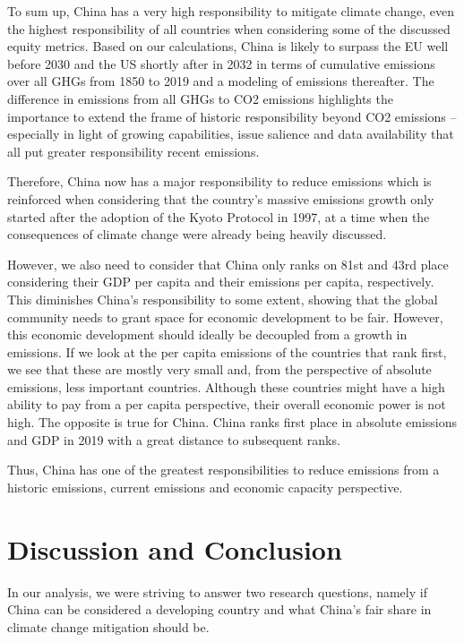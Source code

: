\documentclass[
  12pt,
]{article}
\numberwithin{equation}{section}
\numberwithin{table}{section}
\numberwithin{figure}{section}
\begin{document}
To sum up, China has a very high responsibility to mitigate climate
change, even the highest responsibility of all countries when
considering some of the discussed equity metrics. Based on our
calculations, China is likely to surpass the EU well before 2030 and the
US shortly after in 2032 in terms of cumulative emissions over all GHGs
from 1850 to 2019 and a modeling of emissions thereafter. The difference
in emissions from all GHGs to CO2 emissions highlights the importance to
extend the frame of historic responsibility beyond CO2 emissions --
especially in light of growing capabilities, issue salience and data
availability that all put greater responsibility recent emissions.

Therefore, China now has a major responsibility to reduce emissions
which is reinforced when considering that the country's massive
emissions growth only started after the adoption of the Kyoto Protocol
in 1997, at a time when the consequences of climate change were already
being heavily discussed.

However, we also need to consider that China only ranks on 81st and 43rd
place considering their GDP per capita and their emissions per capita,
respectively. This diminishes China's responsibility to some extent,
showing that the global community needs to grant space for economic
development to be fair. However, this economic development should
ideally be decoupled from a growth in emissions. If we look at the per
capita emissions of the countries that rank first, we see that these are
mostly very small and, from the perspective of absolute emissions, less
important countries. Although these countries might have a high ability
to pay from a per capita perspective, their overall economic power is
not high. The opposite is true for China. China ranks first place in
absolute emissions and GDP in 2019 with a great distance to subsequent
ranks.

Thus, China has one of the greatest responsibilities to reduce emissions
from a historic emissions, current emissions and economic capacity
perspective.

\hypertarget{discussion-and-conclusion}{%
\section{Discussion and Conclusion}\label{discussion-and-conclusion}}

In our analysis, we were striving to answer two research questions,
namely if China can be considered a developing country and what China's
fair share in climate change mitigation should be.
\end{document}
